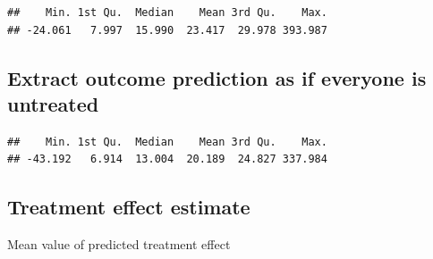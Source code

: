 \documentclass[
]{book}
\newenvironment{Shaded}{\begin{snugshade}}{\end{snugshade}}
\newcommand{\AttributeTok}[1]{\textcolor[rgb]{0.77,0.63,0.00}{#1}}
\newcommand{\DecValTok}[1]{\textcolor[rgb]{0.00,0.00,0.81}{#1}}
\newcommand{\FunctionTok}[1]{\textcolor[rgb]{0.00,0.00,0.00}{#1}}
\newcommand{\NormalTok}[1]{#1}
\newcommand{\OtherTok}[1]{\textcolor[rgb]{0.56,0.35,0.01}{#1}}
\newcommand{\SpecialCharTok}[1]{\textcolor[rgb]{0.00,0.00,0.00}{#1}}
\newcommand{\StringTok}[1]{\textcolor[rgb]{0.31,0.60,0.02}{#1}}
\begin{document}
\begin{verbatim}
##    Min. 1st Qu.  Median    Mean 3rd Qu.    Max. 
## -24.061   7.997  15.990  23.417  29.978 393.987
\end{verbatim}

\hypertarget{extract-outcome-prediction-as-if-everyone-is-untreated}{%
\subsection{Extract outcome prediction as if everyone is untreated}\label{extract-outcome-prediction-as-if-everyone-is-untreated}}

\begin{Shaded}
\end{Shaded}

\begin{verbatim}
##    Min. 1st Qu.  Median    Mean 3rd Qu.    Max. 
## -43.192   6.914  13.004  20.189  24.827 337.984
\end{verbatim}

\hypertarget{treatment-effect-estimate-1}{%
\subsection{Treatment effect estimate}\label{treatment-effect-estimate-1}}

\begin{Shaded}
\end{Shaded}

Mean value of predicted treatment effect

\begin{Shaded}
\end{Shaded}
\end{document}
